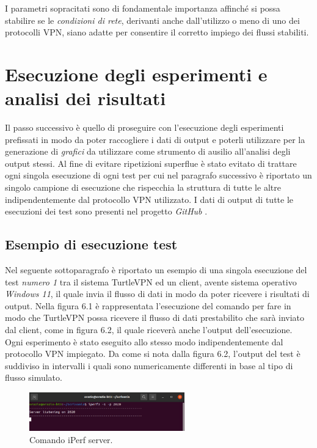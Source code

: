I parametri sopracitati sono di fondamentale importanza affinché si possa stabilire se le \emph{condizioni di rete}, derivanti anche dall'utilizzo o meno di uno dei protocolli VPN, siano adatte per consentire il corretto impiego dei flussi stabiliti.

\section{Esecuzione degli esperimenti e analisi dei risultati}
Il passo successivo è quello di proseguire con l'esecuzione degli esperimenti prefissati in modo da poter raccogliere i dati di output e poterli utilizzare per la generazione di \emph{grafici} da utilizzare come strumento di ausilio all'analisi degli output stessi. Al fine di evitare ripetizioni superflue è stato evitato di trattare ogni singola esecuzione di ogni test per cui nel paragrafo successivo è riportato un singolo campione di esecuzione che rispecchia la struttura di tutte le altre indipendentemente dal protocollo VPN utilizzato. I dati di output di tutte le esecuzioni dei test sono presenti nel progetto \emph{GitHub} \cite{pro}.

\subsection{Esempio di esecuzione test}
Nel seguente sottoparagrafo è riportato un esempio di una singola esecuzione del test \emph{numero 1} tra il sistema TurtleVPN ed un client, avente sistema operativo \emph{Windows 11}, il quale invia il flusso di dati in modo da poter ricevere i risultati di output. Nella figura 6.1 è rappresentata l'esecuzione del comando per fare in modo che TurtleVPN possa ricevere il flusso di dati prestabilito che sarà inviato dal client, come in figura 6.2, il quale riceverà anche l'output dell'esecuzione. Ogni esperimento è stato eseguito allo stesso modo indipendentemente dal protocollo VPN impiegato. Da come si nota dalla figura 6.2, l'output del test è suddiviso in intervalli i quali sono numericamente differenti in base al tipo di flusso simulato.

\begin{figure}[h] \includegraphics[width=0.6\textwidth] {Tesi magistrale/capitoli/images/iPerf server.png}
\centering
\caption{Comando iPerf server.}
\end{figure}

